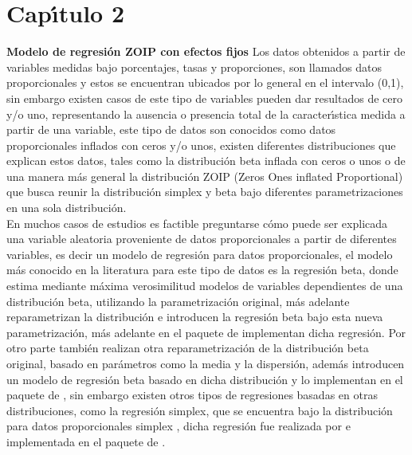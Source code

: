 \chapter{Cap\'{\i}tulo 2}
{\Huge \textbf{Modelo de regresi\'{o}n ZOIP con efectos fijos}}\vspace{1cm}
Los datos obtenidos a partir de variables medidas bajo porcentajes, tasas y proporciones, son llamados datos proporcionales y estos se encuentran ubicados por lo general en el intervalo (0,1), sin embargo existen casos de este tipo de variables pueden dar resultados de cero y/o uno, representando la ausencia o presencia total de la caracter\'{\i}stica medida a partir de una variable, este tipo de datos son conocidos como datos proporcionales inflados con ceros y/o unos, existen diferentes distribuciones que explican estos datos, tales como la distribuci\'{o}n beta inflada con ceros o unos \citep{Ospina2} o de una manera m\'{a}s general la distribuci\'{o}n ZOIP (Zeros Ones inflated Proportional) que busca reunir la distribuci\'{o}n simplex y beta bajo diferentes parametrizaciones en una sola distribuci\'{o}n.\\

En muchos casos de estudios es factible preguntarse c\'{o}mo puede ser explicada una variable aleatoria proveniente de datos proporcionales a partir de diferentes variables, es decir un modelo de regresi\'{o}n para datos proporcionales, el modelo m\'{a}s conocido en la literatura para este tipo de datos es la regresi\'{o}n beta, donde \cite{Paolino1} estima mediante m\'{a}xima verosimilitud modelos de variables dependientes de una distribuci\'{o}n beta, utilizando la parametrizaci\'{o}n original, m\'{a}s adelante  \cite{Ferrari2} reparametrizan la distribuci\'{o}n e introducen la regresi\'{o}n beta bajo esta nueva parametrizaci\'{o}n, m\'{a}s adelante en el paquete  de  \citep{Zeileis1} implementan dicha regresi\'{o}n. Por otro parte \cite{Stasinopoulos2} tambi\'{e}n realizan otra reparametrizaci\'{o}n de la distribuci\'{o}n beta original, basado en par\'{a}metros como la media y la dispersi\'{o}n, adem\'{a}s introducen un modelo de regresi\'{o}n beta basado en dicha distribuci\'{o}n y lo implementan en el paquete  de , sin embargo existen otros tipos de regresiones basadas en otras distribuciones, como la regresi\'{o}n simplex, que se encuentra bajo la distribuci\'{o}n para datos proporcionales simplex \citep{Barndorff1}, dicha regresi\'{o}n fue realizada por \cite{Qiu1} e implementada en el paquete  de  \citep{Zhang1}.\\

